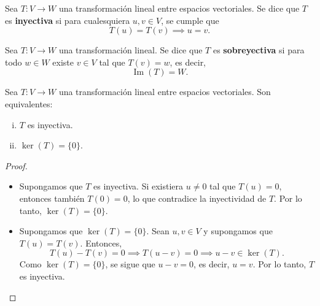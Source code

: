 \begin{definition}
Sea $T: V \to W$ una transformación lineal entre espacios vectoriales. Se dice que $T$ es \textbf{inyectiva} si para cualesquiera $u, v \in V$, se cumple que
\[
T(u) = T(v) \implies u = v.
\]
\end{definition}

\begin{definition}
Sea $T: V \to W$ una transformación lineal. Se dice que $T$ es \textbf{sobreyectiva} si para todo $w \in W$ existe $v \in V$ tal que $T(v) = w$, es decir,
\[
\operatorname{Im}(T) = W.
\]
\end{definition}


\begin{theorem}
Sea $T: V \to W$ una transformación lineal entre espacios vectoriales. Son equivalentes:
\begin{enumerate}[i.]
    \item $T$ es inyectiva.
    \item $\ker(T) = \{0\}$.
\end{enumerate}
\begin{proof}
\begin{itemize}
    \item[$i. \implies ii.$] Supongamos que $T$ es inyectiva. Si existiera $u \neq 0$ tal que $T(u) = 0$, entonces también $T(0) = 0$, lo que contradice la inyectividad de $T$. Por lo tanto, $\ker(T) = \{0\}$.
    \item[$ii. \implies i.$] Supongamos que $\ker(T) = \{0\}$. Sean $u, v \in V$ y supongamos que $T(u) = T(v)$. Entonces,
    \[
    T(u) - T(v) = 0 \implies T(u - v) = 0 \implies u - v \in \ker(T).
    \]
    Como $\ker(T) = \{0\}$, se sigue que $u - v = 0$, es decir, $u = v$. Por lo tanto, $T$ es inyectiva.
\end{itemize}
\end{proof}
\end{theorem}

